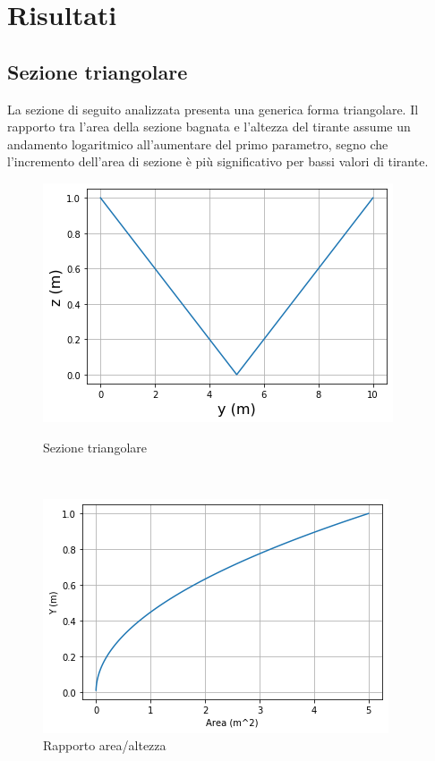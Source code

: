 \documentclass[12pt]{article} %
\begin{document}
\newpage

\section{Risultati}
\subsection{Sezione triangolare}

\noindent La sezione di seguito analizzata presenta una generica forma triangolare.
Il rapporto tra l’area della sezione bagnata e l’altezza del tirante assume un andamento logaritmico all’aumentare del primo parametro, segno che l’incremento dell’area di sezione è più significativo per bassi valori di tirante.

\begin{figure}[H]
\begin{minipage}[b]{8.5cm}
\centering
    \includegraphics[width=1 \textwidth]{sezionetri.png}
    \caption{Sezione triangolare}
    \label{fig:triangolare_sezione}
\end{minipage}
\ \hspace{2mm} \hspace{3mm} \
\begin{minipage}[b]{8.5cm}
    \centering
    \includegraphics[width=1 \textwidth]{rapporto area altezzatri.png}
    \caption{Rapporto area/altezza}
    \label{fig:triangolare_area/altezza}
\end{minipage}
\end{figure}
\end{document}
